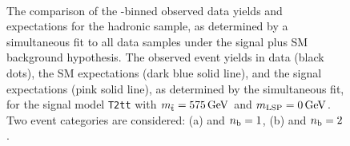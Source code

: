 \begin{figure}[t!]
  \begin{center}
     \\
    \caption{\label{fig:t2tt-best-fit-575}The comparison of
      the \scalht-binned observed data yields and expectations for the
      hadronic sample, as determined by a simultaneous fit to all data
      samples under the signal plus SM background hypothesis. The
      observed event yields in data (black dots), the SM expectations
      (dark blue solid line), and the signal expectations (pink solid
      line), as determined by the simultaneous fit, for the
      signal model \texttt{T2tt} with $m_{\tilde{\rm t}} = 575\,\text{Ge\hspace{-.08em}V}$ and
      $m_{\text{LSP}} = 0\,\text{Ge\hspace{-.08em}V}$. Two event categories are
      considered: (a) \njethigh and $n_{\text{b}} = 1$, (b) \njethigh and
      $n_{\text{b}} = 2$.}
  \end{center}
\end{figure}
